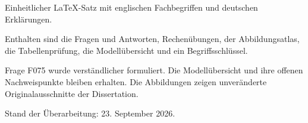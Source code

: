 \documentclass[11pt,a4paper]{article}
\begin{document}
\begin{titlepage}
\vspace{6mm}{\LARGE Fragenkatalog und Lernskript\par}
\vspace{12mm}{\large Vorbereitung für Florian Rzepka\par}
\vspace{16mm}
Einheitlicher LaTeX-Satz mit englischen Fachbegriffen und deutschen Erklärungen.

Enthalten sind die Fragen und Antworten, Rechenübungen, der Abbildungsatlas, die Tabellenprüfung, die Modellübersicht und ein Begriffsschlüssel.

Frage F075 wurde verständlicher formuliert. Die Modellübersicht und ihre offenen Nachweispunkte bleiben erhalten. Die Abbildungen zeigen unveränderte Originalausschnitte der Dissertation.

\vfill Stand der Überarbeitung: 23. September 2026.
\end{titlepage}
\tableofcontents
\end{document}
